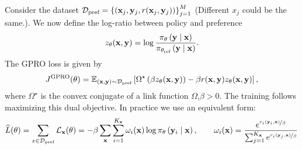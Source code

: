\documentclass[11pt]{article}  %
\begin{document}
Consider the dataset $\mathcal{D}_{\text{pref}} = \left\{ (\mathbf{x}_j, \mathbf{y}_j, r(\mathbf{x}_j, \mathbf{y}_j)) \right\}_{j=1}^M$ (Different $x_j$ could be the same.).
We now define the log-ratio between policy and preference 
\begin{align*}
  z_\theta(\mathbf{x}, \mathbf{y}) = \log \frac{\pi_{\theta}\left( \mathbf{y} \mid \mathbf{x} \right)}{\pi_{\theta_{\text{ref}}}\left( \mathbf{y} \mid \mathbf{x} \right)}.
\end{align*}
The GPRO loss is given by 
\begin{align*}
  J^{\text{GPRO}}(\theta) = \mathbb{E}_{\left( \mathbf{x}, \mathbf{y} \right) \sim \mathcal{D}_{\text{pref}}}\left[\Omega^\star\left( \beta z_\theta(\mathbf{x}, \mathbf{y}) \right) - \beta r(\mathbf{x}, \mathbf{y})z_{\theta}(\mathbf{x}, \mathbf{y})\right],
\end{align*}
where $\Omega^\star$ is the convex conjugate of a link function $\Omega$,$\beta > 0$.
The training follows maximizing this dual objective.
In practice we use an equivalent form:
\begin{align*}
  \widehat{L}(\theta) = \sum_{x \in \mathcal{D}_{\text{pref}}} \mathcal{L}_{\mathbf{x}}(\theta) = -\beta \sum_{\mathbf{x}} \sum_{i=1}^{K_{\mathbf{x}}} \omega_i(\mathbf{x})\log \pi_{\theta}\left( \mathbf{y}_i \mid \mathbf{x} \right), \qquad \omega_i(\mathbf{x}) = \frac{e^{\nicefrac{r_i(\mathbf{y}_i, \mathbf{x})}{\beta}}}{\sum_{j=1}^{K_{\mathbf{x}}}e^{\nicefrac{r_i(\mathbf{y}_j, \mathbf{x})}{\beta}}}
\end{align*}
\end{document}
